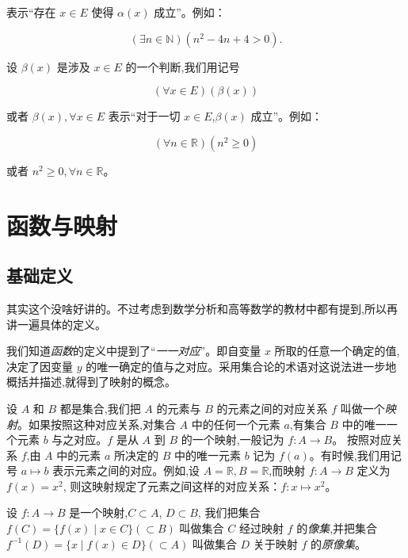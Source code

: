 \documentclass[lang=cn,10pt,twoside]{elegantbook}
\begin{document}
表示“存在 $x \in E$ 使得 $\alpha(x)$ 成立”。例如：

\begin{equation*}
  (\exists n \in \mathbb{N})(n^2 -4n + 4 > 0).
\end{equation*}

设 $\beta(x)$ 是涉及 $x \in E$ 的一个判断,我们用记号

\begin{equation*}
  (\forall x \in E)(\beta(x))
\end{equation*}

或者 $\beta(x), \forall x \in E$ 表示“对于一切 $x \in E$,$\beta(x)$ 成立”。例如：

\begin{equation*}
  (\forall n \in \mathbb{R})(n^2 \geq 0)
\end{equation*}

或者 $n^2 \geq 0, \forall n \in \mathbb{R}$。

\section{函数与映射}

\subsection{基础定义}

其实这个没啥好讲的。不过考虑到数学分析和高等数学的教材中都有提到,所以再讲一遍具体的定义。

我们知道\emph{函数}的定义中提到了“\emph{一一对应}”。即自变量 $x$ 所取的任意一个确定的值,决定了因变量 $y$ 的唯一确定的值与之对应。采用集合论的术语对这说法进一步地概括并描述,就得到了映射的概念。

设 $A$ 和 $B$ 都是集合,我们把 $A$ 的元素与 $B$ 的元素之间的对应关系 $f$ 叫做一个\emph{映射}。如果按照这种对应关系,对集合 $A$ 中的任何一个元素 $a$,有集合 $B$ 中的唯一一个元素 $b$ 与之对应。$f$ 是从 $A$ 到 $B$ 的一个映射,一般记为 $f:A\rightarrow B$。
按照对应关系 $f$,由 $A$ 中的元素 $a$ 所决定的 $B$ 中的唯一元素 $b$ 记为 $f(a)$。有时候,我们用记号 $a \mapsto b$ 表示元素之间的对应。例如,设 $A=\mathbb R, B = \mathbb R$,而映射 $f: A \rightarrow B$ 定义为 $f(x) = x^2$, 则这映射规定了元素之间这样的对应关系：$f: x \mapsto x^2$。


设 $f:A\rightarrow B$ 是一个映射,$C \subset A$, $D \subset B$, 我们把集合 $f(C)=\{f(x) \mid x \in C\}(\subset B)$ 叫做集合 $C$ 经过映射 $f$ 的\emph{像集},并把集合 $f^{-1}(D)=\{x \mid f(x) \in D\}(\subset A)$ 叫做集合 $D$ 关于映射 $f$ 的\emph{原像集}。
\end{document}

